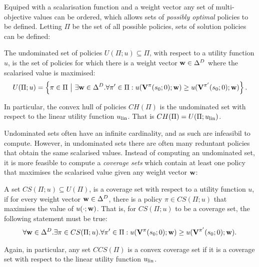     Equiped with a scalarisation function and a weight vector any set of multi-objective values can be ordered, which allows sets of \textit{possibly optimal} policies to be defined. Letting $\Pi$ be the set of all possible policies, sets of solution policies can be defined:
    \begin{defn}
        \label{def:undominated_set}
        \label{def:convex_hull}
        The \textnormal{undominated set} of policies $U(\Pi;u)\subseteq\Pi$, with respect to a utility function $u$,  is the set of policies for which there is a weight vector $\mathbf{w}\in\Delta^D$ where the scalarised value is maximised: 
        \begin{align}
            U(\Pi;u) = \left\{\pi\in\Pi\ \big|\ \exists \mathbf{w}\in\Delta^D. \forall \pi'\in\Pi: u(\mathbf{V}^{\pi}(s_0;0);\mathbf{w}) \geq u(\mathbf{V}^{\pi'}(s_0;0);\mathbf{w}) \right\}.
        \end{align}

        In particular, the \textnormal{convex hull} of policies $CH(\Pi)$ is the undominated set with respect to the linear utility function $u_{{\textnormal{lin}}}$. That is $CH(\Pi)=U(\Pi;u_{{\textnormal{lin}}})$.
    \end{defn}    

    Undominated sets often have an infinite cardinality, and as such are infeasibil to compute. However, in undominated sets there are often many reduntant policies that obtain the same scalarised values. Instead of computing an undominated set, it is more feasible to compute a \textit{coverage sets} which contain at least one policy that maximises the scalarised value given any weight vector $\mathbf{w}$:
    \begin{defn}
        \label{def:coverage_set}
        \label{def:convex_coverage_set}
        A set $CS(\Pi;u)\subseteq U(\Pi)$, is a \textnormal{coverage set} with respect to a utility function $u$, if for every weight vector $\mathbf{w}\in\Delta^D$, there is a policy $\pi\in CS(\Pi;u)$ that maximises the value of $u(\cdot;\mathbf{w})$. That is, for $CS(\Pi;u)$ to be a coverage set, the following statement must be true:
        \begin{align}
            \forall \mathbf{w}\in\Delta^D. \exists \pi\in CS(\Pi;u). \forall \pi'\in\Pi: u(\mathbf{V}^{\pi}(s_0;0);\mathbf{w}) \geq u(\mathbf{V}^{\pi'}(s_0;0);\mathbf{w}).
        \end{align}

        Again, in particular, any set $CCS(\Pi)$ is a \textnormal{convex coverage set} if it is a coverage set with respect to the linear utility function $u_{{\textnormal{lin}}}$. 
    \end{defn}

